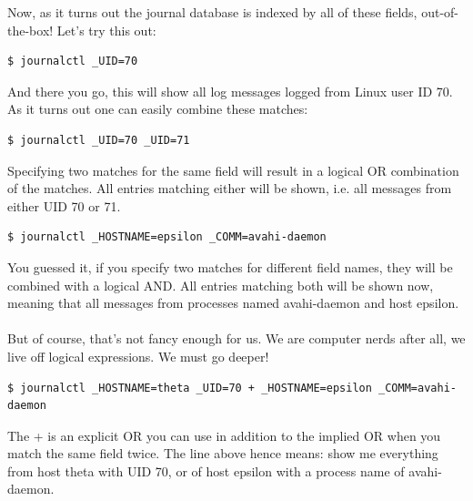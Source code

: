 \documentclass[titlepage]{article}
\begin{document}
Now, as it turns out the journal database is indexed by all of these fields, out-of-the-box! Let's try this out:
\begin{lstlisting}
$ journalctl _UID=70
\end{lstlisting}
And there you go, this will show all log messages logged from Linux user ID 70. As it turns out one can easily combine these matches:
\begin{lstlisting}
$ journalctl _UID=70 _UID=71
\end{lstlisting}
Specifying two matches for the same field will result in a logical OR combination of the matches. All entries matching either will be shown, i.e. all messages from either UID 70 or 71.
\begin{lstlisting}
$ journalctl _HOSTNAME=epsilon _COMM=avahi-daemon
\end{lstlisting}
You guessed it, if you specify two matches for different field names, they will be combined with a logical AND. All entries matching both will be shown now, meaning that all messages from processes named avahi-daemon and host epsilon.
\\
\\
But of course, that's not fancy enough for us. We are computer nerds after all, we live off logical expressions. We must go deeper!
\begin{lstlisting}
$ journalctl _HOSTNAME=theta _UID=70 + _HOSTNAME=epsilon _COMM=avahi-daemon
\end{lstlisting}
The + is an explicit OR you can use in addition to the implied OR when you match the same field twice. The line above hence means: show me everything from host theta with UID 70, or of host epsilon with a process name of avahi-daemon.
\end{document}
